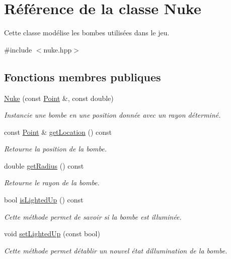 \hypertarget{classNuke}{}\section{Référence de la classe Nuke}
\label{classNuke}


Cette classe modélise les bombes utilisées dans le jeu.  




{\ttfamily \#include $<$nuke.\+hpp$>$}

\subsection*{Fonctions membres publiques}
\begin{DoxyCompactItemize}
\item 
\hyperlink{classNuke_ab1b0d5faca4c5399b48e39774965fe62}{Nuke} (const \hyperlink{classPoint}{Point} \&, const double)
\begin{DoxyCompactList}\small\item\em Instancie une bombe en une position donnée avec un rayon déterminé. \end{DoxyCompactList}\item 
const \hyperlink{classPoint}{Point} \& \hyperlink{classNuke_a4cd753f8284d74613e91b46f94c6b678}{get\+Location} () const 
\begin{DoxyCompactList}\small\item\em Retourne la position de la bombe. \end{DoxyCompactList}\item 
double \hyperlink{classNuke_a4668365cff840c31886f35e9579bb1ac}{get\+Radius} () const 
\begin{DoxyCompactList}\small\item\em Retourne le rayon de la bombe. \end{DoxyCompactList}\item 
bool \hyperlink{classNuke_a85380caea565414da1ab78f4290fe1c8}{is\+Lighted\+Up} () const 
\begin{DoxyCompactList}\small\item\em Cette méthode permet de savoir si la bombe est illuminée. \end{DoxyCompactList}\item 
void \hyperlink{classNuke_a9abff8ef15814700c6a3a5f9f3962d25}{set\+Lighted\+Up} (const bool)
\begin{DoxyCompactList}\small\item\em Cette méthode permet d\textquotesingle{}établir un nouvel état d\textquotesingle{}illumination de la bombe. \end{DoxyCompactList}\item 

\end{DoxyCompactItemize}
